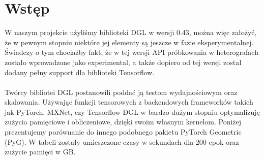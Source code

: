 \documentclass{article}
\begin{document}
\section{Wstęp}
\label{sec:intro}
W naszym projekcie użyliśmy biblioteki DGL w wersji 0.43, można więc założyć, że w pewnym stopniu niektóre jej elementy są jeszcze w fazie eksperymentalnej. Świadczy o tym chociażby fakt, że w tej wersji API próbkowania w  heterografach zostało wprowadzone jako experimental, a także dopiero od tej wersji został dodany pełny support dla biblioteki Tensorflow.
\paragraph{}
Twórcy bibliotei DGL postanowili poddać ją testom wydajnościowym oraz skalowania. Używając funkcji tensorowych z backendowych frameworków takich jak PyTorch, MXNet, czy Tensorflow DGL w bardzo dużym stopniu optymalizuję zużycia pamięciowe i obliczeniowe, dzięki swoim własnym kernelom. Poniżej prezentujemy porównanie do innego podobnego pakietu PyTorch Geometric (PyG). W tabeli zostały umieszczone czasy w sekundach dla 200 epok oraz zużycie pamięci w GB.
\end{document}
